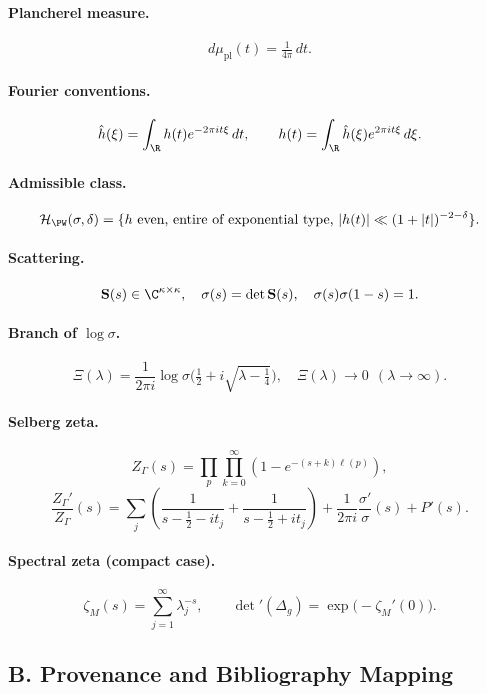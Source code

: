 \paragraph{Plancherel measure.}
\[
  d\mu_{\mathrm{pl}}(t)=\tfrac{1}{4\pi}\,dt.
\]

\paragraph{Fourier conventions.}
\[
  \hat h(\xi)=\int_{\R} h(t)e^{-2\pi i t\xi}\,dt, \qquad
  h(t)=\int_{\R}\hat h(\xi)e^{2\pi i t\xi}\,d\xi.
\]

\paragraph{Admissible class.}
\[
  \mathcal H_{\PW}(\sigma,\delta)=\{h\ \text{even, entire of exponential type,}\ |h(t)|\ll (1+|t|)^{-2-\delta}\}.
\]

\paragraph{Scattering.}
\[
  \mathbf S(s)\in\C^{\kappa\times\kappa}, \quad \sigma(s)=\det \mathbf S(s), \quad \sigma(s)\sigma(1-s)=1.
\]

\paragraph{Branch of $\log\sigma$.}
\[
  \Xi(\lambda)=\frac{1}{2\pi i}\log\sigma\!\Big(\tfrac12+i\sqrt{\lambda-\tfrac14}\Big), \quad \Xi(\lambda)\to 0\ \ (\lambda\to\infty).
\]

\paragraph{Selberg zeta.}
\[
  Z_\Gamma(s)=\prod_{p}\prod_{k=0}^\infty \left(1-e^{-(s+k)\ell(p)}\right),
\]
\[
  \frac{Z_\Gamma'}{Z_\Gamma}(s)=\sum_j\left(\frac{1}{s-\tfrac12-it_j}+\frac{1}{s-\tfrac12+it_j}\right)+\frac{1}{2\pi i}\frac{\sigma'}{\sigma}(s)+P'(s).
\]

\paragraph{Spectral zeta (compact case).}
\[
  \zeta_M(s)=\sum_{j=1}^\infty \lambda_j^{-s}, \qquad 
  \det{}'(\Delta_g)=\exp\!\big(-\zeta_M'(0)\big).
\]

\subsection*{B. Provenance and Bibliography Mapping}
\label{subsec:provenance}

